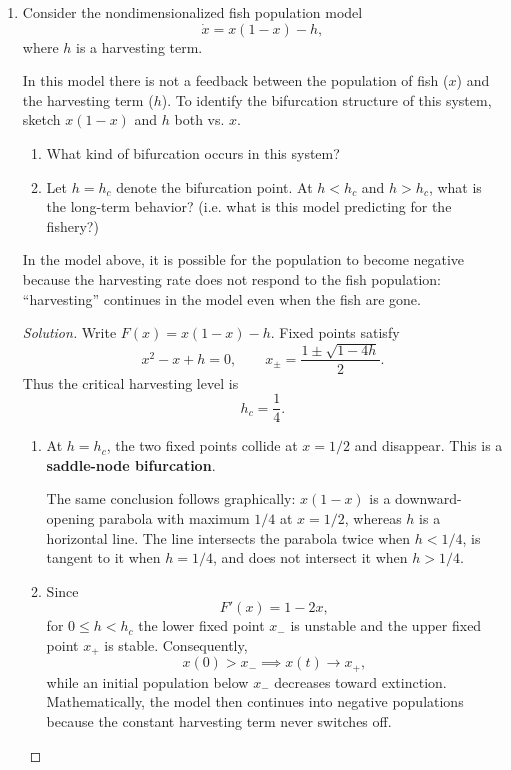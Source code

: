 \documentclass[12pt]{amsart}
\theoremstyle{conjecture}
\theoremstyle{definition}
\theoremstyle{question}
\theoremstyle{theorem}
\newenvironment{solution}
{\begin{proof}[Solution]}
{\end{proof}}
\begin{document}
    \begin{enumerate}
        \item Consider the nondimensionalized fish population model
        \[
            \dot{x}=x(1-x)-h,
        \]
        where $h$ is a harvesting term.

        In this model there is not a feedback between the population of fish ($x$) and the harvesting term
        ($h$). To identify the bifurcation structure of this system, sketch $x(1-x)$ and $h$ both vs. $x$.

        \begin{enumerate}[label=(\alph*)]
            \item What kind of bifurcation occurs in this system?
            \item Let $h=h_c$ denote the bifurcation point. At $h<h_c$ and $h>h_c$, what is the long-term
            behavior? (i.e. what is this model predicting for the fishery?)
        \end{enumerate}

        In the model above, it is possible for the population to become negative because the harvesting
        rate does not respond to the fish population: ``harvesting'' continues in the model even when the
        fish are gone.

        \begin{solution}
            Write $F(x)=x(1-x)-h$. Fixed points satisfy
            \[
                x^2-x+h=0,
                \qquad
                x_{\pm}=\frac{1\pm\sqrt{1-4h}}{2}.
            \]
            Thus the critical harvesting level is
            \[
                h_c=\frac14.
            \]

            \begin{enumerate}[label=(\alph*)]
    \item At $h=h_c$, the two fixed points collide at $x=1/2$ and disappear. This is a
    \textbf{saddle-node bifurcation}.

    The same conclusion follows graphically: $x(1-x)$ is a downward-opening parabola with maximum
    $1/4$ at $x=1/2$, whereas $h$ is a horizontal line. The line intersects the parabola twice when
    $h<1/4$, is tangent to it when $h=1/4$, and does not intersect it when $h>1/4$.

    \item Since
    \[
        F'(x)=1-2x,
    \]
    for $0\le h<h_c$ the lower fixed point $x_-$ is unstable and the upper fixed point $x_+$ is
    stable. Consequently,
    \[
        x(0)>x_- \implies x(t)\longrightarrow x_+,
    \]
    while an initial population below $x_-$ decreases toward extinction. Mathematically, the model
    then continues into negative populations because the constant harvesting term never switches off.


\end{enumerate}
\end{solution}
\end{enumerate}
\end{document}
